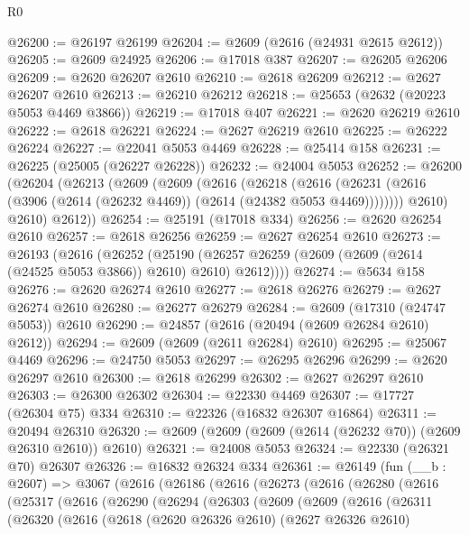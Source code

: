 \begin{lexlean}{R0}
\begin{coremodule}
@26200 := @26197 @26199
@26204 := @2609 (@2616 (@24931 @2615 @2612))
@26205 := @2609 @24925
@26206 := @17018 @387
@26207 := @26205 @26206
@26209 := @2620 @26207 @2610
@26210 := @2618 @26209
@26212 := @2627 @26207 @2610
@26213 := @26210 @26212
@26218 := @25653 (@2632 (@20223 @5053 @4469 @3866))
@26219 := @17018 @407
@26221 := @2620 @26219 @2610
@26222 := @2618 @26221
@26224 := @2627 @26219 @2610
@26225 := @26222 @26224
@26227 := @22041 @5053 @4469
@26228 := @25414 @158
@26231 := @26225 (@25005 (@26227 @26228))
@26232 := @24004 @5053
@26252 := @26200
    (@26204
      (@26213
        (@2609
          (@2609
            (@2616
              (@26218
                (@2616
                  (@26231 (@2616 (@3906 (@2614 (@26232 @4469)) (@2614 (@24382 @5053 @4469))))))))
            @2610)
          @2610)
        @2612))
@26254 := @25191 (@17018 @334)
@26256 := @2620 @26254 @2610
@26257 := @2618 @26256
@26259 := @2627 @26254 @2610
@26273 := @26193
    (@2616
      (@26252
        (@25190 (@26257 @26259 (@2609 (@2609 (@2614 (@24525 @5053 @3866)) @2610) @2610) @2612))))
@26274 := @5634 @158
@26276 := @2620 @26274 @2610
@26277 := @2618 @26276
@26279 := @2627 @26274 @2610
@26280 := @26277 @26279
@26284 := @2609 (@17310 (@24747 @5053)) @2610
@26290 := @24857 (@2616 (@20494 (@2609 @26284 @2610) @2612))
@26294 := @2609 (@2609 (@2611 @26284) @2610)
@26295 := @25067 @4469
@26296 := @24750 @5053
@26297 := @26295 @26296
@26299 := @2620 @26297 @2610
@26300 := @2618 @26299
@26302 := @2627 @26297 @2610
@26303 := @26300 @26302
@26304 := @22330 @4469
@26307 := @17727 (@26304 @75) @334
@26310 := @22326 (@16832 @26307 @16864)
@26311 := @20494 @26310
@26320 := @2609 (@2609 (@2609 (@2614 (@26232 @70)) (@2609 @26310 @2610)) @2610)
@26321 := @24008 @5053
@26324 := @22330 (@26321 @70) @26307
@26326 := @16832 @26324 @334
@26361 := @26149
    (fun (__b : @2607) =>
    @3067
      (@2616
        (@26186
          (@2616
            (@26273
              (@2616
                (@26280
                  (@2616
                    (@25317
                      (@2616
                        (@26290
                          (@26294
                            (@26303
                              (@2609
                                (@2609
                                  (@2616
                                    (@26311
                                      (@26320
                                        (@2616
                                          (@2618
                                            (@2620 @26326 @2610)
                                            (@2627 @26326 @2610)

\end{coremodule}
\end{lexlean}
